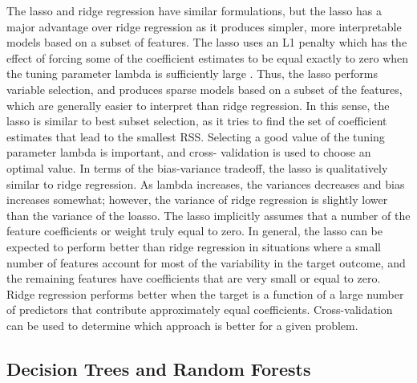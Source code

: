 \documentclass[sigconf]{acmart}
\begin{document}
The lasso and ridge regression have similar formulations, but the lasso has a 
major advantage over ridge regression as it produces simpler, more interpretable
models based on a subset of features. The lasso uses an L1 penalty which has the 
effect of forcing some of the coefficient estimates to be equal exactly to zero 
when the tuning parameter lambda is sufficiently large \cite{statlearn13}. Thus, 
the lasso performs variable selection, and produces sparse models based on a 
subset of the features, which are generally easier to interpret than ridge 
regression. In this sense, the lasso is similar to best subset selection, as it
tries to find the set of coefficient estimates that lead to the smallest RSS. 
Selecting a good value of the tuning parameter lambda is important, and cross-
validation is used to choose an optimal value. In terms of the bias-variance
tradeoff, the lasso is qualitatively similar to ridge regression. As lambda
increases, the variances decreases and bias increases somewhat; however, the
variance of ridge regression is slightly lower than the variance of the loasso.
The lasso implicitly assumes that a number of the feature coefficients or
weight truly equal to zero. In general, the lasso can be expected to perform
better than ridge regression in situations where a small number of features
account for most of the variability in the target outcome, and the remaining
features have coefficients that are very small or equal to zero. Ridge 
regression performs better when the target is a function of a large number of 
predictors that contribute approximately equal coefficients. Cross-validation
can be used to determine which approach is better for a given problem. 


\subsection{Decision Trees and Random Forests}
\end{document}
